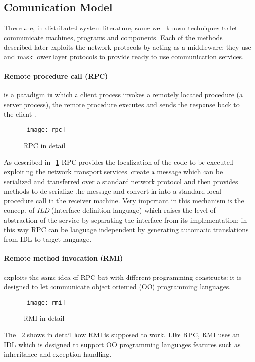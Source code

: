 \subsection{Comunication Model}
\par
There are, in distributed system literature, some well known techniques to let communicate machines, programs and components. Each of the methods described later exploits the network protocols by acting as a middleware: they use and mask lower layer protocols to provide ready to use communication services.

\paragraph{Remote procedure call (RPC)} is a paradigm in which a client process invokes a remotely located procedure (a server process), the remote procedure executes and sends the response back to the client \cite{Jerome2009Principles}.
\begin{figure}[h]
	\centering
	\texttt{[image: rpc]}
	\caption{RPC in detail}
	\label{fig:2.10}
\end{figure} 
As described in \figurename~\ref{fig:2.10} RPC provides the localization of the code to be executed exploiting the network transport services, create a message which can be serialized and transferred over a standard network protocol and then provides methods to de-serialize the message and convert in into a standard local procedure call in the receiver machine. Very important in this mechanism is the concept of \textit{ILD} (Interface definition language) which raises the level of abstraction of the service by separating the interface from its implementation: in this way RPC can be language independent by generating automatic translations from IDL to target language.  
\paragraph{Remote method invocation (RMI)} exploits the same idea of RPC but with different programming constructs: it is designed to let communicate object oriented (OO) programming languages.
\begin{figure}[h]
	\centering
	\texttt{[image: rmi]}
	\caption{RMI in detail}
	\label{fig:2.11}
\end{figure} 
The \figurename~\ref{fig:2.11} shows in detail how RMI is supposed to work. Like RPC, RMI uses an IDL which is designed to support OO programming languages features such as inheritance and exception handling.
